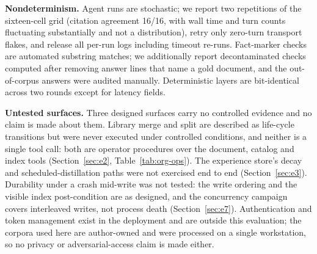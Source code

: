 \noindent\textbf{Nondeterminism.} Agent runs are stochastic; we report two
repetitions of the sixteen-cell grid (citation agreement 16/16, with wall time
and turn counts fluctuating substantially and not a distribution), retry only
zero-turn transport flakes, and release all per-run logs including timeout
re-runs. Fact-marker checks are automated substring matches; we additionally
report decontaminated checks computed after removing answer lines that name a
gold document, and the out-of-corpus answers were audited manually.
Deterministic layers are bit-identical across two rounds except for latency
fields.

\noindent\textbf{Untested surfaces.} Three designed surfaces carry no
controlled evidence and no claim is made about them. Library merge and split
are described as life-cycle transitions but were never executed under
controlled conditions, and neither is a single tool call: both are operator
procedures over the document, catalog and index tools
(Section~\ref{sec:e2}, Table~\ref{tab:org-ops}). The experience store's decay
and scheduled-distillation paths were not exercised end to end
(Section~\ref{sec:e3}). Durability under a crash mid-write was not tested: the
write ordering and the visible index post-condition are as designed, and the
concurrency campaign covers interleaved writes, not process death
(Section~\ref{sec:e7}). Authentication and token management exist in the
deployment and are outside this evaluation; the corpora used here are
author-owned and were processed on a single workstation, so no privacy or
adversarial-access claim is made either.
